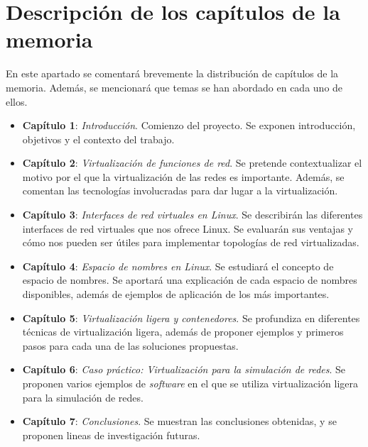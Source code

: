 \documentclass[a4paper, oneside, 12pt]{book}
\begin{document}
	\section[Resumen capítulos de la memoria]{Descripción de los capítulos de la memoria}
	\noindent En este apartado se comentará brevemente la distribución de capítulos de la memoria. Además, se mencionará que temas se han abordado en cada uno de ellos.
	\begin{itemize}
		\item \textbf{Capítulo 1}: \textit{Introducción}. Comienzo del proyecto. Se exponen introducción, objetivos y el contexto del trabajo. \\
		
		\item \textbf{Capítulo 2}: \textit{Virtualización de funciones de red}. Se pretende contextualizar el motivo por el que la virtualización de las redes es importante. Además, se comentan las tecnologías involucradas para dar lugar a la virtualización. \\
		
		\item \textbf{Capítulo 3}: \textit{Interfaces de red virtuales en Linux}. Se describirán las diferentes interfaces de red virtuales que nos ofrece Linux. Se evaluarán sus ventajas y cómo nos pueden ser útiles para implementar topologías de red virtualizadas. \\
		
		\item \textbf{Capítulo 4}: \textit{Espacio de nombres en Linux}. Se estudiará el concepto de espacio de nombres. Se aportará una explicación de cada espacio de nombres disponibles, además de ejemplos de aplicación de los más importantes. \\
		
		\item \textbf{Capítulo 5}: \textit{Virtualización ligera y contenedores}. Se profundiza en diferentes técnicas de virtualización ligera, además de proponer ejemplos y primeros pasos para cada una de las soluciones propuestas. \\
		
		\item \textbf{Capítulo 6}: \textit{Caso práctico: Virtualización para la simulación de redes}. Se proponen varios ejemplos de \textit{software} en el que se utiliza virtualización ligera para la simulación de redes. \\
		
		\item \textbf{Capítulo 7}: \textit{Conclusiones}. Se muestran las conclusiones obtenidas, y se proponen lineas de investigación futuras. \\
	\end{itemize}
	
\end{document}
